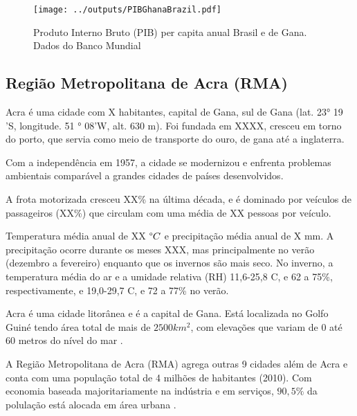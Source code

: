 \begin{figure}[H]
\begin{center}
  \texttt{[image: ../outputs/PIBGhanaBrazil.pdf]}
  \caption{Produto Interno Bruto (PIB) per capita anual Brasil e de Gana. 
           Dados do Banco Mundial \citep{bancomundial} \label{fg:pib}}
\end{center}
\end{figure}


\subsection{Região Metropolitana de Acra (RMA)}

Acra é uma cidade com X habitantes, capital de Gana, 
sul de Gana (lat. 23° 19 'S, longitude. 51 ° 08'W, alt. 630 m). 
Foi fundada em XXXX, cresceu em torno do porto, que servia como meio de transporte
do ouro, de gana até a inglaterra. 

Com a independência em 1957, a cidade se modernizou e enfrenta problemas 
ambientais comparável a grandes cidades de países desenvolvidos. 

A frota motorizada cresceu XX\% na última década, e é dominado por veículos 
de passageiros (XX\%) que circulam com uma média de XX pessoas por veículo. 

Temperatura média anual de XX $\degree C$ e precipitação média anual de X mm. 
A precipitação ocorre durante os meses XXX, mas principalmente no verão 
(dezembro a fevereiro) enquanto que os invernos são mais seco. 
No inverno, a temperatura média do ar e a umidade relativa (RH) 11,6-25,8 C, 
e 62 a 75\%, respectivamente, e 19,0-29,7 C, e 72 a 77\% no verão. 


Acra é uma cidade litorânea e é a capital de Gana. Está localizada 
no Golfo Guiné tendo área total de mais de  $2500 km^2$, com elevações que 
variam de 0 até 60 metros do nível do mar \citep{ARKU2008}.

A Região Metropolitana de Acra (RMA) agrega outras 9 cidades
além de Acra e conta com uma população total de 4 milhões de habitantes (2010). 
Com economia baseada majoritariamente na indústria e em serviços, 
$90,5\%$ da polulação está alocada em área urbana \citep{ghanacensus2013}.

